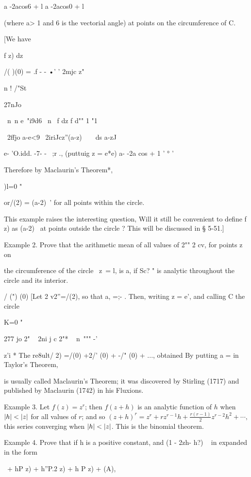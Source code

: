 {{a -2acos6 + l a -2acos0 + l

(where a> 1 and 6 is the vectorial angle) at points on the
circumference of C.

[We have

f z) dz

/( )(0) = .f - - •' ' 2mjc z"

n ! /"St

27nJo

\ n\ n e~"i9d6 \ n \ f dz f d"" 1 "1

~2ffjo a-e<9 ~2iriJcz''(a-z)~~\ \ ds a-zJ

e- 'O.idd. -7- - ~;r ., (puttuig z = e*e) a- -2a cos + 1 ' ° '

Therefore by Maclaurin's Theorem*,

)l=0 "

or/(2) = (a-2)~' for all points within the circle.

This example raises the interesting question, Will it still be
convenient to define f z) as (a-2)~ at points outside the circle ?
This will be discussed in § 5-51.]

Example 2. Prove that the arithmetic mean of all values of 2"" 2 cv,
for points z on

the circumference of the circle \ z\ = l, is a, if Sc? " is analytic
throughout the circle and its interior.

/ (") (0) [Let 2 v2''=/(2), so that a, =;- . Then, writing z = e',
and calling C the circle

K=0 "

277 jo 2" ~ 2ni j c 2"* ~ n\ """ -'

z'i * The re8ult/ 2) =/(0) +2/' (0) + -/" (0) + ..., obtained By
putting a = in Taylor's Theorem,

is usually called Maclaurin's Theorem; it was discovered by Stirling
(1717) and published by Maclaurin (1742) in his Fluxions.

%
%

Example 3. Let $f(z) = z^{r}$; then $f(z+h)$ is an analytic function
of $h$ when $\left| h \right| < \left| z \right|$ for all values of $r$; and so
$(z + h)^{r} = z^{r} + rz^{r-1} h + \frac{ r (r-1) }{2} z^{r-2} h^{2}
+ \cdots, $ this series converging when $\left| h \right| < \left| z \right|$.
This is the binomial theorem.

Example 4. Prove that if h is a positive constant, and (1 - 2zh- h?) ~
in expanded in the form

\ + hP z) + h''P.2 z) + h P z) + (A),

}}
